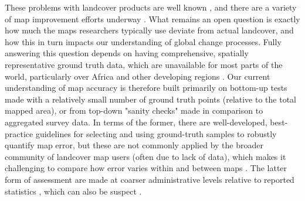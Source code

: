 \documentclass{pnastwo}
\begin{document}
\begin{article}
These problems with landcover products are well known \cite{fritz_comparison_2010, fritz_cropland_2011, see_improved_2015, fritz_mapping_2015,verburg_challenges_2011}, and there are a variety of map improvement efforts underway \cite[e.g.][]{fritz_geo-wiki:_2012, estes_platform_2015}. What remains an open question is exactly how much the maps researchers typically use deviate from actual landcover, and how this in turn impacts our understanding of global change processes. Fully answering this question depends on having comprehensive, spatially representative ground truth data, which are unavailable for most parts of the world, particularly over Africa and other developing regions \cite{see_improved_2015}. Our current understanding of map accuracy is therefore built primarily on bottom-up tests made with a relatively small number of ground truth points (relative to the total mapped area), or from top-down "sanity checks" made in comparison to aggregated survey data.  In terms of the former, there are well-developed, best-practice guidelines for selecting and using ground-truth samples to robustly quantify map error, but these are not commonly applied by the broader community of landcover map users (often due to lack of data), which makes it challenging to compare how error varies within and between maps \cite{stehman_global_2012, olofsson_making_2013,olofsson_good_2014,foody_status_2002}. The latter form of assessment are made at coarser administrative levels relative to reported statistics \cite[e.g.][]{fritz_comparison_2010}, which can also be suspect \cite{carletto_emperor_2013,fao_action_2013}. 

%
%
%
%
%
%
%
%
%
%
%


\end{article}
\end{document}
